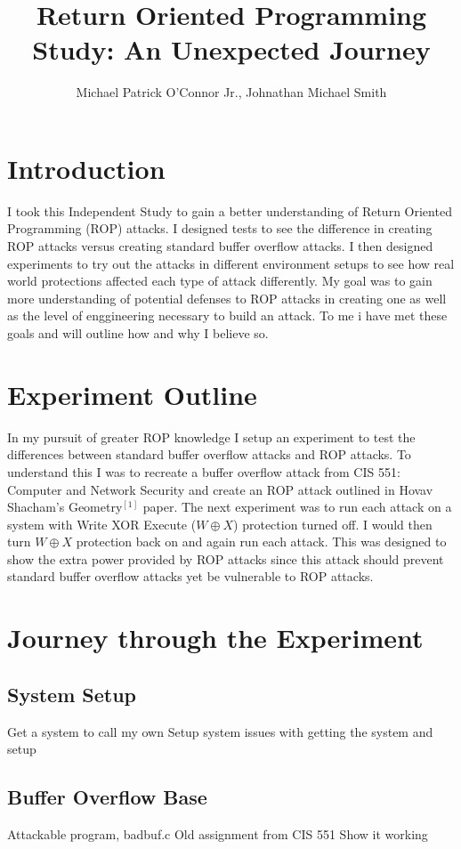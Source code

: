 \documentclass[11pt]{amsart}
\title{Return Oriented Programming Study: \newline An Unexpected Journey}
\author{Michael Patrick O'Connor Jr., Johnathan Michael Smith}
\date{}
\begin{document}
\maketitle

\newpage
\section*{Introduction}
I took this Independent Study to gain a better understanding of Return Oriented Programming (ROP) attacks. I designed tests to see the difference in creating ROP attacks versus creating standard buffer overflow attacks.  I then designed experiments to try out the attacks in different environment setups to see how real world protections affected each type of attack differently.  My goal was to gain more understanding of potential defenses to ROP attacks in creating one as well as the level of enggineering necessary to build an attack.  To me i have met these goals and will outline how and why I believe so.
\section*{Experiment Outline}
In my pursuit of greater ROP knowledge I setup an experiment to test the differences between standard buffer overflow attacks and ROP attacks.  To understand this I was to recreate a buffer overflow attack from CIS 551: Computer and Network Security and create an ROP attack outlined in Hovav Shacham's Geometry$^[1]$ paper.
The next experiment was to run each attack on a system with Write XOR Execute ($W \oplus X$) protection turned off.  I would then turn $W \oplus X$ protection back on and again run each attack.  This was designed to show the extra power provided by ROP attacks since this attack should prevent standard buffer overflow attacks yet be vulnerable to ROP attacks.
\section*{Journey through the Experiment}
\subsection*{System Setup}
Get a system to call my own
Setup system
	issues with getting the system and setup
\subsection*{Buffer Overflow Base}
Attackable program, badbuf.c
Old assignment from CIS 551
Show it working
\end{document}
